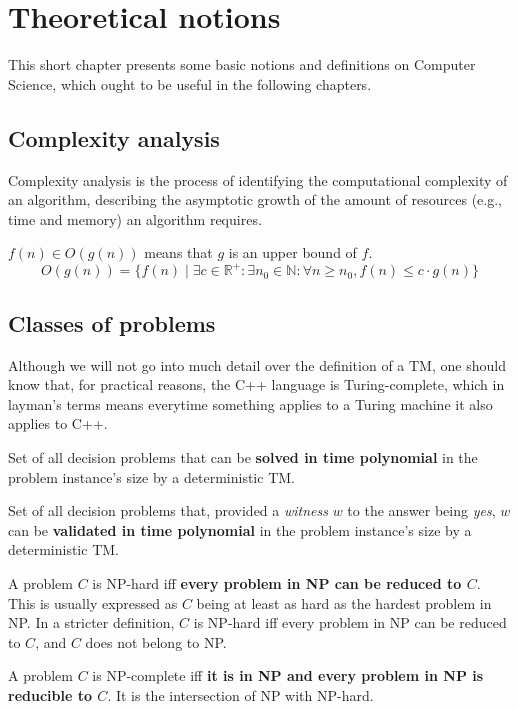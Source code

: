 \chapter{Theoretical notions} \label{theoretical-notions}
This short chapter presents some basic notions and definitions on Computer Science, which ought to be useful in the following chapters.
\section{Complexity analysis} \label{complexity-analysis}
Complexity analysis is the process of identifying the computational complexity of an algorithm, describing the asymptotic growth of the amount of resources (e.g., time and memory) an algorithm requires.
\begin{definition} $f(n) \in O(g(n))$ means that $g$ is an upper bound of $f$.
    \begin{equation*}
        O(g(n))=\{f(n) \mid \exists c \in \mathbb{R}^+ \colon \exists n_0 \in \mathbb{N} \colon \forall n \geq n_0, f(n) \leq c\cdot g(n)\}
    \end{equation*}
\end{definition}
\section{Classes of problems} \label{classes-problems}
Although we will not go into much detail over the definition of a \acrfull*{TM}, one should know that, for practical reasons, the C++ language is Turing-complete, which in layman's terms means everytime something applies to a Turing machine it also applies to C++.
\begin{definition}[P]
    Set of all decision problems that can be \textbf{solved in time polynomial} in the problem instance's size by a deterministic \acrshort{TM}.
\end{definition}
\begin{definition}[NP]
    Set of all decision problems that, provided a \emph{witness} $w$ to the answer being \emph{yes}, $w$ can be \textbf{validated in time polynomial} in the problem instance's size by a deterministic \acrshort{TM}.
\end{definition}
\begin{definition}[NP-hard]
    A problem $C$ is NP-hard iff \textbf{every problem in NP can be reduced to $C$}. This is usually expressed as $C$ being at least as hard as the hardest problem in NP. In a stricter definition, $C$ is NP-hard iff every problem in NP can be reduced to $C$, and $C$ does not belong to NP.
\end{definition}
\begin{definition}[NP-complete]
    A problem $C$ is NP-complete iff \textbf{it is in NP and every problem in NP is reducible to $C$}. It is the intersection of NP with NP-hard.
\end{definition}
\pagebreak
